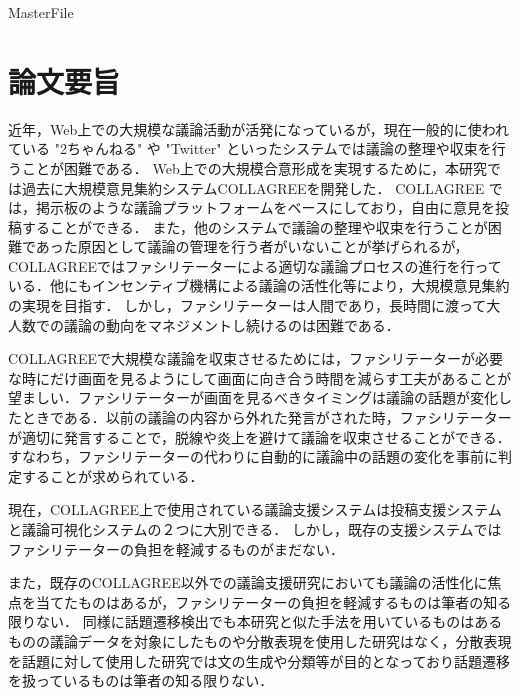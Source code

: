 \expandafter\ifx\csname MasterFile\endcsname\relax
\def\SubFile{hoge}


\fi
\cleardoublepage
\chapter*{論文要旨}
近年，Web上での大規模な議論活動が活発になっているが，現在一般的に使われている "2ちゃんねる" や "Twitter" といったシステムでは議論の整理や収束を行うことが困難である．
%
Web上での大規模合意形成を実現するために，本研究では過去に大規模意見集約システムCOLLAGREEを開発した．
COLLAGREE では，掲示板のような議論プラットフォームをベースにしており，自由に意見を投稿することができる．
また，他のシステムで議論の整理や収束を行うことが困難であった原因として議論の管理を行う者がいないことが挙げられるが，COLLAGREEではファシリテーターによる適切な議論プロセスの進行を行っている．他にもインセンティブ機構による議論の活性化等により，大規模意見集約の実現を目指す．
しかし，ファシリテーターは人間であり，長時間に渡って大人数での議論の動向をマネジメントし続けるのは困難である．

COLLAGREEで大規模な議論を収束させるためには，ファシリテーターが必要な時にだけ画面を見るようにして画面に向き合う時間を減らす工夫があることが望ましい．ファシリテーターが画面を見るべきタイミングは議論の話題が変化したときである．以前の議論の内容から外れた発言がされた時，ファシリテーターが適切に発言することで，脱線や炎上を避けて議論を収束させることができる．
すなわち，ファシリテーターの代わりに自動的に議論中の話題の変化を事前に判定することが求められている．

現在，COLLAGREE上で使用されている議論支援システムは投稿支援システムと議論可視化システムの２つに大別できる．
しかし，既存の支援システムではファシリテーターの負担を軽減するものがまだない．
\begin{comment}
ポイント機能(ユーザの議論行動を活性化)-1
ファシリテーションフレーズ簡易投稿機能-1
議論ツリー-2
１文の要約，スレッドの要約，クラスタリング，返信意見の極性判定-2
ファシリテーションスタンプ-1
キーワード抽出-2
いいね機能-1
いいねランキング-2
投票機能-1
議論フェーズ機能-2
1-意見を出す、投稿をする際に補助や選択肢、リアクションを与える
2-議論の別の見方を提供する
\end{comment}
%
また，既存のCOLLAGREE以外での議論支援研究においても議論の活性化に焦点を当てたものはあるが，ファシリテーターの負担を軽減するものは筆者の知る限りない．
同様に話題遷移検出でも本研究と似た手法を用いているものはあるものの議論データを対象にしたものや分散表現を使用した研究はなく，分散表現を話題に対して使用した研究では文の生成や分類等が目的となっており話題遷移を扱っているものは筆者の知る限りない．

